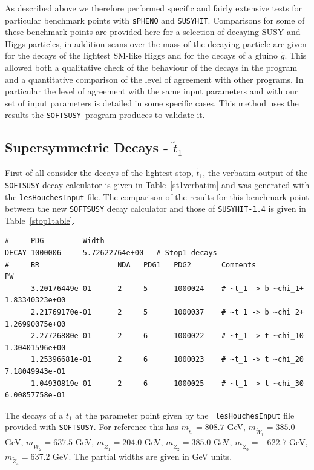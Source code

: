 \documentclass[final,3p,times]{elsarticle}
\def\SOFTSUSY{{\tt SOFTSUSY}}
\def\code#1{{\tt #1}}
\begin{document}
As described above we therefore performed specific and fairly extensive tests for particular benchmark
points with \code{sPHENO} and \code{SUSYHIT}. Comparisons for some of these benchmark points are provided here for a selection of decaying SUSY and Higgs particles, in addition scans over the mass of the decaying particle are given for the decays of the lightest SM-like Higgs and for the decays of a gluino $\tilde{g}$. This allowed both a qualitative check of the behaviour of the decays in the program and a quantitative comparison of the level of agreement with other programs. In particular the level of agreement with the same input parameters and with our set of input parameters is detailed in some specific cases. This method uses the results the \SOFTSUSY~program produces to validate it. 


\subsection{Supersymmetric Decays - $\tilde{t}_1$}

First of all consider the decays of the lightest stop, $\tilde{t}_1$, the
verbatim output of the {\tt SOFTSUSY} decay calculator is given in
Table~\ref{st1verbatim} and was generated with the {\tt lesHouchesInput}
file. The comparison of the results for this benchmark point between the new
{\tt SOFTSUSY} decay calculator and those of {\tt SUSYHIT-1.4} is given in
Table~\ref{stop1table}. 


\begin{table}
\begin{verbatim}
#     PDG         Width             
DECAY 1000006     5.72622764e+00   # Stop1 decays
#     BR                  NDA   PDG1   PDG2       Comments                PW                
      3.20176449e-01      2     5      1000024    # ~t_1 -> b ~chi_1+     1.83340323e+00    
      2.21769170e-01      2     5      1000037    # ~t_1 -> b ~chi_2+     1.26990075e+00    
      2.27726880e-01      2     6      1000022    # ~t_1 -> t ~chi_10     1.30401596e+00    
      1.25396681e-01      2     6      1000023    # ~t_1 -> t ~chi_20     7.18049943e-01    
      1.04930819e-01      2     6      1000025    # ~t_1 -> t ~chi_30     6.00857758e-01    
\end{verbatim}
\caption{The decays of a $\tilde{t}_1$ at the parameter point given by the {\tt
    lesHouchesInput} file provided with {\tt SOFTSUSY}. For reference this has
  $m_{\tilde{t}_1} = 808.7$ GeV, $m_{\tilde{W}_1} = 385.0$ GeV,
  $m_{\tilde{W}_2} = 637.5$ GeV, $m_{\tilde{Z}_1} = 204.0$ GeV,
  $m_{\tilde{Z}_2} = 385.0$ GeV, $m_{\tilde{Z}_3} = -622.7$ GeV,
  $m_{\tilde{Z}_4} = 637.2$ GeV. The partial widths are given in GeV units.} \label{st1verbatim}
\end{table}
\end{document}
